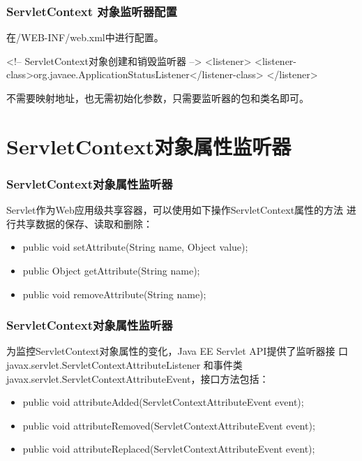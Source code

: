 \begin{frame}[fragile] %
\frametitle{ServletContext 对象监听器配置} 

在/WEB-INF/web.xml中进行配置。

\begin{xmlCode}
<!-- ServletContext对象创建和销毁监听器 -->
<listener>  
  <listener-class>org.javaee.ApplicationStatusListener</listener-class>
</listener>  
\end{xmlCode}

不需要映射地址，也无需初始化参数，只需要监听器的包和类名即可。
\end{frame}

\section{ServletContext对象属性监听器}

\begin{frame}[fragile] %
\frametitle{ServletContext对象属性监听器}


Servlet作为Web应用级共享容器，可以使用如下操作ServletContext属性的方法
进行共享数据的保存、读取和删除：

\begin{itemize}
\item public void setAttribute(String name, Object value);
\item public Object getAttribute(String name);
\item public void removeAttribute(String name);
\end{itemize}
\end{frame}

\begin{frame}[fragile] %
\frametitle{ServletContext对象属性监听器}

为监控ServletContext对象属性的变化，Java EE Servlet API提供了监听器接
口javax.servlet.ServletContextAttributeListener 和事件类
javax.servlet.ServletContextAttributeEvent，接口方法包括：

\begin{itemize}
\item public void attributeAdded(ServletContextAttributeEvent event);
\item public void attributeRemoved(ServletContextAttributeEvent
  event);
\item public void attributeReplaced(ServletContextAttributeEvent event);
\end{itemize}
\end{frame}

